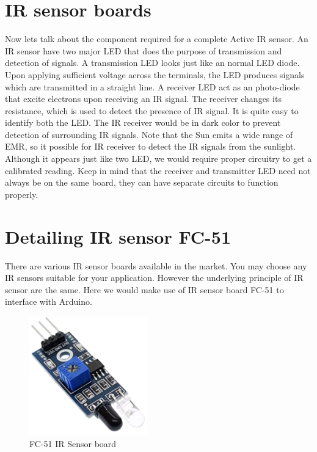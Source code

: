 \section{\ac{IR} sensor boards}
Now lets talk about the component required for a complete Active \ac{IR} sensor. An \ac{IR} sensor have two major LED that does the purpose of transmission and detection of signals. A transmission LED looks just like an normal LED diode. Upon applying sufficient voltage across the terminals, the LED produces signals which are transmitted in a straight line. A receiver LED act as an photo-diode that excite electrons upon receiving an \ac{IR} signal. The receiver changes its resistance, which is used to detect the presence of \ac{IR} signal. It is quite easy to identify both the LED. The \ac{IR} receiver would be in dark color to prevent detection of surrounding \ac{IR} signals. Note that the Sun emits a wide range of \ac{EMR}, so it possible for \ac{IR} receiver to detect the \ac{IR} signals from the sunlight. Although it appears just like two LED, we would require proper circuitry to get a calibrated reading. Keep in mind that the receiver and transmitter LED need not always be on the same board, they can have separate circuits to function properly.

\section{Detailing \ac{IR} sensor FC-51}
\par There are various \ac{IR} sensor boards available in the market. You may choose any \ac{IR} sensors suitable for your application. However the underlying principle of \ac{IR} sensor are the same. Here we would make use of \ac{IR} sensor board FC-51 to interface with Arduino.

\begin{figure}
	\centering
	\includegraphics[width=2in]{Images/IR Sensor/IR_board.png}
	\caption{FC-51 \ac{IR} Sensor board}
\end{figure}

